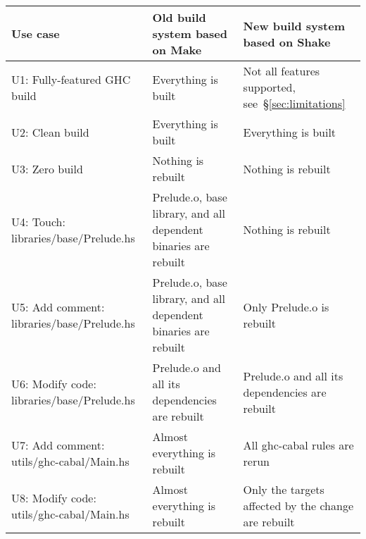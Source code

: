 \newcommand{\checkedbox}{\makebox[0pt][l]{$\square$}\raisebox{.15ex}{\hspace{0.1em}$\checkmark$}}
\newcommand{\uncheckedbox}{\makebox[0pt][l]{$\square$}\raisebox{.15ex}{\hspace{0.92em}}}
\begin{table*}[t]
\centering
\begin{tabular}{p{60mm} || p{50mm} | p{50mm}}
\textbf{Use case}
& \textbf{Old build system} based on Make
& \textbf{New build system} based on Shake
\\
\hline
\textsf{U1:} Fully-featured GHC build
& Everything is built \hfill \checkedbox
& Not all features supported, see~\S\ref{sec:limitations} \hfill \uncheckedbox
\\
\textsf{U2:} Clean build
& Everything is built \hfill \checkedbox
& Everything is built \hfill \checkedbox
\\
\textsf{U3:} Zero build \hspace{6.4mm}
& Nothing is rebuilt \hfill \checkedbox
& Nothing is rebuilt \hfill \checkedbox
\\
\hline
\textsf{U4:} Touch: \hspace{10.2mm}\textsf{libraries/base/Prelude.hs}
& \textsf{Prelude.o}, \textsf{base} library, and all \hfill \uncheckedbox
\newline dependent binaries are rebuilt
& Nothing is rebuilt \hfill \checkedbox
\\
\textsf{U5:} Add comment: \textsf{libraries/base/Prelude.hs}
& \textsf{Prelude.o}, \textsf{base} library, and all \hfill \uncheckedbox
\newline dependent binaries are rebuilt
& Only \textsf{Prelude.o} is rebuilt \hfill \checkedbox
\\
\textsf{U6:} Modify code: \hspace{1.75mm}\textsf{libraries/base/Prelude.hs}
& \textsf{Prelude.o} and all its dependencies \hfill \checkedbox \newline
are rebuilt
& \textsf{Prelude.o} and all its dependencies \hfill \checkedbox \newline
are rebuilt
\\
\textsf{U7:} Add comment: \textsf{utils/ghc-cabal/Main.hs}
& Almost everything is rebuilt \hfill \uncheckedbox
& All \textsf{ghc-cabal} rules are rerun \hfill \uncheckedbox
\\
\textsf{U8:} Modify code: \hspace{1.75mm}\textsf{utils/ghc-cabal/Main.hs}
& Almost everything is rebuilt \hfill \uncheckedbox
& Only the targets affected by the \hfill \checkedbox \newline change are rebuilt

\end{tabular}
\end{table*}
